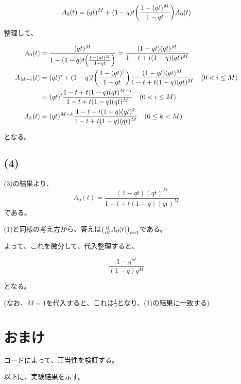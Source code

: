\documentclass[a4paper, 10pt, dvipdfmx]{jlreq}
\begin{document}
\begin{align*}
    A_0(t)  = (qt)^M+(1-q)t\qty(\frac{1-(qt)^M}{1-qt})A_0(t) \\
\end{align*}

整理して、

\begin{align*}
    A_0(t)     & =\frac{(qt)^M}{1-(1-q)t\qty(\frac{1-(qt)^M}{1-qt})} = \frac{(1-qt)(qt)^M}{1-t+t(1-q)(qt)^M}         \\
    A_{M-i}(t) & =(qt)^i+(1-q)t\qty(\frac{1-(qt)^i}{1-qt})\frac{(1-qt)(qt)^M}{1-t+t(1-q)(qt)^M} \quad (0 < i \leq M) \\
               & =   (qt)^i \frac{1-t+t(1-q)(qt)^{M-i}}{1-t+t(1-q)(qt)^M} \quad (0 < i \leq M)                       \\
    A_{k}(t)   & =(qt)^{M-k} \frac{1-t+t(1-q)(qt)^{k}}{1-t+t(1-q)(qt)^M} \quad (0 \leq k < M)                        \\
\end{align*}

となる。

\subsection*{(4)}

(3)の結果より、
\begin{equation*}
    A_0(t) =\frac{(1-qt)(qt)^M}{1-t+t(1-q)(qt)^M}
\end{equation*}
である。

(1)と同様の考え方から、答えは$\qty(\dv{t}A_0(t))_{t=1}$である。

よって、これを微分して、代入整理すると、

\begin{equation*}
    \frac{1-q^M}{(1-q)q^M}
\end{equation*}

となる。

(なお、$M=1$を代入すると、これは$\frac{1}{q}$となり、(1)の結果に一致する)

\section{おまけ}

コードによって、正当性を検証する。



以下に、実験結果を示す。
\end{document}
